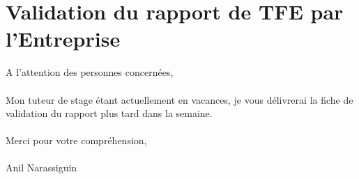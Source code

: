 \newpage
\section*{Validation du rapport de TFE par l'Entreprise}
A l'attention des personnes concern\'ees,
\\
\\
Mon tuteur de stage \'etant actuellement en vacances, je vous d\'elivrerai la fiche de validation du rapport plus tard dans la semaine.
\\
\\
Merci pour votre compr\'ehension,
\\
\\
Anil Narassiguin